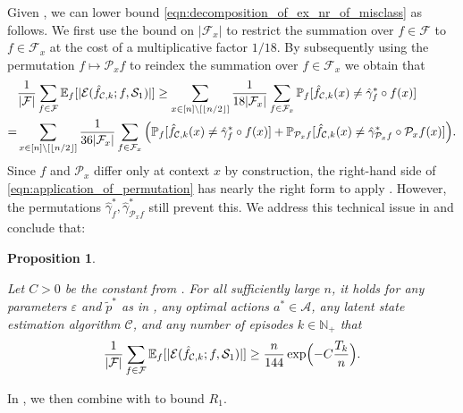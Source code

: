 \documentclass[11pt]{article}
\newcommand{\mcA}{\mathcal{A}}
\newcommand{\mcC}{\mathcal{C}}
\newcommand{\mcE}{\mathcal{E}}
\newcommand{\mcF}{\mathcal{F}}
\newcommand{\mcP}{\mathcal{P}}
\newcommand{\mcS}{\mathcal{S}}
\newcommand{\mbbP}{\mathbb{P}}
\newcommand{\mbbE}{\mathbb{E}}
\newcommand{\mbbN}{\mathbb{N}}
\DeclarePairedDelimiter\floor{\lfloor}{\rfloor}
\newtheorem{proposition}[theorem]{Proposition}
\theoremstyle{definition}
\theoremstyle{definition}
\begin{document}
Given , we can lower bound \eqref{eqn:decomposition_of_ex_nr_of_misclass} as follows.
We first use the bound on $|\mcF_x|$ to restrict the summation over $f\in\mcF$ to $f\in\mcF_x$ at the cost of a multiplicative factor $1/18$.
By subsequently using the permutation $f\mapsto\mcP_xf$ to reindex the summation over $f\in\mcF_x$ we obtain that
\begin{align}
	 &
	\frac{1}{|\mcF|}
	\sum_{f\in\mcF}
	\mbbE_{f}[|\mcE(\hat{f}_{\mcC,k};f,\mcS_1)|]
	\nonumber
	\geq
	\sum_{x \in[n]\setminus[\floor{n/2}]}
	\frac{1}{18|\mcF_x|}\sum_{f\in\mcF_x}\mbbP_{f}[\hat{f}_{\mcC,k}(x)\neq \hat{\gamma}^*_f \circ f (x)]
	\nonumber \\
	=
	 &
	\sum_{x \in[n]\setminus[\floor{n/2}]}
	\frac{1}{36|\mcF_x|}\sum_{f\in\mcF_x}
	\Big(
	\mbbP_{f}[\hat{f}_{\mcC,k}(x)\neq \hat{\gamma}^*_f\circ f(x)]
	+
	\mbbP_{\mcP_xf}[\hat{f}_{\mcC,k}(x)\neq \hat{\gamma}^*_{\mcP_xf}\circ \mcP_xf(x)]
	\Big)
	.
	\label{eqn:application_of_permutation}
\end{align}
Since $f$ and $\mcP_x$ differ only at context $x$ by construction, the right-hand side of \eqref{eqn:application_of_permutation} has nearly the right form to apply .
However, the permutations $\hat{\gamma}^*_f, \hat{\gamma}^*_{\mcP_xf}$ still prevent this.
We address this technical issue in  and conclude that:

\begin{proposition}
	\label{prop:lower_bound_misclassification_rate}

    Let $C>0$ be the constant from .
    For all sufficiently large $n$, it holds for any parameters $\varepsilon$ and $\tilde{p}^*$ as in , any optimal actions $a^*\in\mcA$, any latent state estimation algorithm $\mcC$, and any number of episodes $k\in\mbbN_+$ that
    \begin{align}
        \label{eqn:reduction_to_local_misclassification_probability}
        \frac{1}{|\mcF|}
        \sum_{f\in\mcF}
        \mbbE_{f}[
            |\mcE(\hat{f}_{\mcC,k};f,\mcS_1)|
        ]
        \geq
        \frac{n}{144}
        \exp
        \Bigl(
        -
        C\frac{T_{k}}{n}
        \Bigr)
        .
    \end{align}
\end{proposition}

In , we then combine  with  to bound $R_1$.
\end{document}
